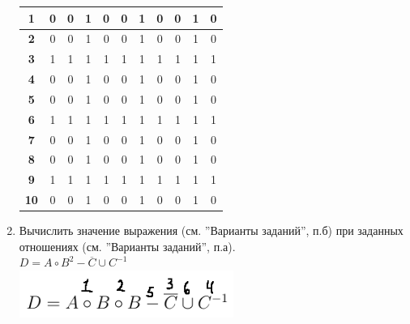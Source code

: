 \documentclass[a4paper,14pt]{extarticle}
\begin{document}
\begin{enumerate}[label=1.\arabic*.]
\begin{center}
\begin{tabular}{|c|c|c|c|c|c|c|c|c|c|c|}
			      \hline\textbf{1}  & 0          & 0          & 1          & 0          & 0          & 1          & 0          & 0          & 1          & 0           \\
			      \hline\textbf{2}  & 0          & 0          & 1          & 0          & 0          & 1          & 0          & 0          & 1          & 0           \\
			      \hline\textbf{3}  & 1          & 1          & 1          & 1          & 1          & 1          & 1          & 1          & 1          & 1           \\
			      \hline\textbf{4}  & 0          & 0          & 1          & 0          & 0          & 1          & 0          & 0          & 1          & 0           \\
			      \hline\textbf{5}  & 0          & 0          & 1          & 0          & 0          & 1          & 0          & 0          & 1          & 0           \\
			      \hline\textbf{6}  & 1          & 1          & 1          & 1          & 1          & 1          & 1          & 1          & 1          & 1           \\
			      \hline\textbf{7}  & 0          & 0          & 1          & 0          & 0          & 1          & 0          & 0          & 1          & 0           \\
			      \hline\textbf{8}  & 0          & 0          & 1          & 0          & 0          & 1          & 0          & 0          & 1          & 0           \\
			      \hline\textbf{9}  & 1          & 1          & 1          & 1          & 1          & 1          & 1          & 1          & 1          & 1           \\
			      \hline\textbf{10} & 0          & 0          & 1          & 0          & 0          & 1          & 0          & 0          & 1          & 0           \\
			      \hline
		      \end{tabular}
	      \end{center}
	      \bigbreak
	\item Вычислить значение выражения (см. ”Варианты заданий”, п.б) при заданных отношениях (см. ”Варианты заданий”, п.а).\\
	      $D=A\circ B^2 - \overline{C} \cup C^{-1}$\\
	      \includegraphics[width=70mm]{1.2}\\

\end{enumerate}
\end{document}
